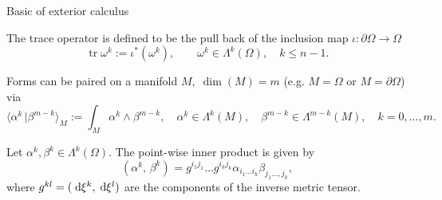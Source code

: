 \documentclass[aspectratio=169]{beamer}
\DeclareMathOperator{\tr}{tr}
\newcommand{\inpr}[3][]{\ensuremath{( #2, \, #3 )_{#1}}}
\newcommand{\dualpr}[3][]{\ensuremath{\langle #2 \, \vert #3 \rangle_{#1}}}
\begin{document}
\begin{frame}{Basic of exterior calculus}
	
	\begin{definition}
		The trace operator is defined to be the pull back of the inclusion map $\iota: \partial \Omega \rightarrow \Omega$
		\begin{equation*}
			\tr \omega^k := \iota^*(\omega^k), \qquad \omega^k \in \Lambda^k(\Omega), \quad k\le n-1.  
		\end{equation*}
	\end{definition}

	\begin{definition}
		Forms can be paired on a manifold $M, \; \dim(M)=m$ (e.g. $M=\Omega$ or $M=\partial \Omega$) via
		\begin{equation*}
			\dualpr[M]{\alpha^k}{\beta^{m-k}} := \int_M \alpha^k \wedge \beta^{m-k}, \quad \alpha^{k} \in \Lambda^{k}(M), \quad \beta^{m-k} \in \Lambda^{m-k}(M), \quad k=0, \dots, m.
		\end{equation*}
	
	\end{definition}

	\begin{definition}\label{eq:local_inpr}
		Let $\alpha^k, \beta^k \in \Lambda^k(\Omega)$. The point-wise inner product is given by
		\begin{equation*}
			\inpr{\alpha^k}{\beta^k} = g^{i_1 j_1} \dots g^{i_k j_k} \alpha_{i_1 \dots i_k} \beta_{j_1 \dots, j_k},
		\end{equation*}
		where $g^{k l} = (\d\xi^k, \d\xi^l)$ are the components of the inverse metric tensor.
	\end{definition}


\end{frame}
\end{document}

